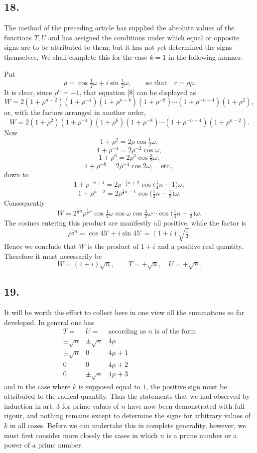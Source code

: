 \documentclass[12pt]{article}
\begin{document}
\subsection*{18.}

The method of the preceding article has supplied the absolute values of the functions $T,U$ and has assigned the conditions under which equal or opposite signs are to be attributed to them; but it has not yet determined the signs themselves. We shall complete this for the case $k=1$ in the following manner.

Put
\[
\rho=\cos\tfrac12\omega+i\sin\tfrac12\omega,\qquad\text{so that}\quad r=\rho\rho.
\]
It is clear, since $\rho^n=-1$, that equation [8] can be displayed as
\[
W=2(1+\rho^{n-2})(1+\rho^{-4})(1+\rho^{n-6})(1+\rho^{-8})\cdots(1+\rho^{-n+4})(1+\rho^2),
\]
or, with the factors arranged in another order,
\[
W=2(1+\rho^2)(1+\rho^{-4})(1+\rho^6)(1+\rho^{-8})\cdots(1+\rho^{-n+4})(1+\rho^{n-2}).
\]
Now
\[
1+\rho^2=2\rho\cos\tfrac12\omega,
\]
\[
1+\rho^{-4}=2\rho^{-2}\cos\omega,
\]
\[
1+\rho^6=2\rho^3\cos\tfrac32\omega,
\]
\[
1+\rho^{-8}=2\rho^{-4}\cos2\omega,\quad\text{etc.},
\]
down to
\[
1+\rho^{-n+4}=2\rho^{-\frac12n+2}\cos\bigl(\tfrac14n-1\bigr)\omega,
\]
\[
1+\rho^{n-2}=2\rho^{\frac12n-1}\cos\bigl(\tfrac14n-\tfrac12\bigr)\omega.
\]
Consequently
\[
W=2^{\frac12n}\rho^{\frac14n}\cos\tfrac12\omega\cos\omega\cos\tfrac32\omega\cdots\cos\bigl(\tfrac14n-\tfrac12\bigr)\omega.
\]
The cosines entering this product are manifestly all positive, while the factor is
\[
\rho^{\frac14n}=\cos45^\circ+i\sin45^\circ=(1+i)\sqrt{\tfrac12}.
\]
Hence we conclude that $W$ is the product of $1+i$ and a positive real quantity. Therefore it must necessarily be
\[
W=(1+i)\sqrt n,\qquad T=+\sqrt n,\quad U=+\sqrt n.
\]

\subsection*{19.}

It will be worth the effort to collect here in one view all the summations so far developed. In general one has
\[
\begin{array}{c|c|c}
T= & U= & \text{according as } n\text{ is of the form}\\ \hline
\pm\sqrt n & \pm\sqrt n & 4\mu\\
\pm\sqrt n & 0 & 4\mu+1\\
0 & 0 & 4\mu+2\\
0 & \pm\sqrt n & 4\mu+3
\end{array}
\]
and in the case where $k$ is supposed equal to $1$, the positive sign must be attributed to the radical quantity. Thus the statements that we had observed by induction in art. 3 for prime values of $n$ have now been demonstrated with full rigour, and nothing remains except to determine the signs for arbitrary values of $k$ in all cases. Before we can undertake this in complete generality, however, we must first consider more closely the cases in which $n$ is a prime number or a power of a prime number.
\end{document}
